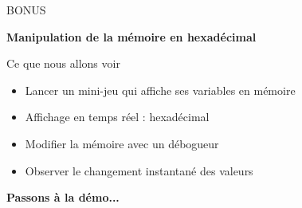 \documentclass[aspectratio=1610]{beamer}
\begin{document}
\begin{frame}{BONUS }

  \begin{center}
    {\Huge \textbf{Manipulation de la mémoire en hexadécimal}}
  \end{center}

  \vspace{1cm}

  \begin{block}{Ce que nous allons voir}
    \begin{itemize}
      \item Lancer un mini-jeu qui affiche ses variables en mémoire
      \item Affichage en temps réel : hexadécimal
      \item Modifier la mémoire avec un débogueur
      \item Observer le changement instantané des valeurs
    \end{itemize}
  \end{block}


  \begin{center}
    {\Large \textbf{Passons à la démo...}}
  \end{center}

\end{frame}

\end{document}
